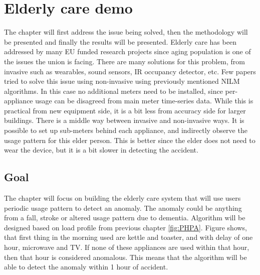 
\chapter{Elderly care demo} %

\label{Chapter7} %

The chapter will first address the issue being solved, then the methodology will be presented and finally the results will be presented.
Elderly care has been addressed by many EU funded research projects since aging population is one of the issues the union is facing. 
There are many solutions for this problem, from invasive such as wearables, sound sensors, IR occupancy detector, etc. 
Few papers tried to solve this issue using non-invasive using previously mentioned NILM algorithms. 
In this case no additional meters need to be installed, since per-appliance usage can be disagreed from main meter time-series data. 
While this is practical from new equipment side, it is a bit less from accuracy side for larger buildings. 
There is a middle way between invasive and non-invasive ways. 
It is possible to set up sub-meters behind each appliance, and indirectly observe the usage pattern for this elder person. 
This is better since the elder does not need to wear the device, but it is a bit slower in detecting the accident. 

\section{Goal}

The chapter will focus on building the elderly care system that will use users periodic usage pattern to detect an anomaly.
The anomaly could be anything from a fall, stroke or altered usage pattern due to dementia. 
Algorithm will be designed based on load profile from previous chapter \ref{fig:PHPA}.
Figure shows, that first thing in the morning used are kettle and toaster, and with delay of one hour, microwave and TV. 
If none of these appliances are used within that hour, then that hour is considered anomalous.
This means that the algorithm will be able to detect the anomaly within 1 hour of accident.

